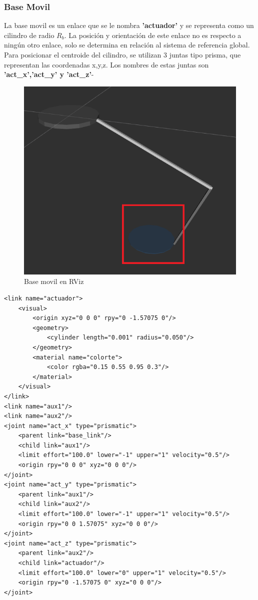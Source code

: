 \begin{lstlisting}
        \end{lstlisting}
       

       \subsubsection{Base Movil}

        La base movil es un enlace que se le nombra \textbf{'actuador'} y se representa como un cilindro de radio \textbf{$R_b$}. La posición y orientación de este enlace no es respecto a ningún otro enlace, solo se determina en relación al sistema de referencia global. Para posicionar el centroide del cilindro, se utilizan 3 juntas tipo prisma, que representan las coordenadas x,y,z. Los nombres de estas juntas son \textbf{'act\_x','act\_y' y 'act\_z'}-

        \begin{figure}[h]
                \centering
                \includegraphics[width=0.4\linewidth]{Main/Chapter6/Images6/cap6_basemovil.png}
                \caption{Base movil en RViz}
                \label{f:Cap6_urdf_4}
            \end{figure}

        \lstset{language=XML}
        \begin{lstlisting}
<link name="actuador">
	<visual>
		<origin xyz="0 0 0" rpy="0 -1.57075 0"/>
		<geometry>
			<cylinder length="0.001" radius="0.050"/>
		</geometry>
		<material name="colorte">
			<color rgba="0.15 0.55 0.95 0.3"/>
		</material>
	</visual>
</link>
<link name="aux1"/>
<link name="aux2"/>
<joint name="act_x" type="prismatic">
	<parent link="base_link"/>
	<child link="aux1"/>
	<limit effort="100.0" lower="-1" upper="1" velocity="0.5"/>
	<origin rpy="0 0 0" xyz="0 0 0"/>
</joint>
<joint name="act_y" type="prismatic">
	<parent link="aux1"/>
	<child link="aux2"/>
	<limit effort="100.0" lower="-1" upper="1" velocity="0.5"/>
	<origin rpy="0 0 1.57075" xyz="0 0 0"/>
</joint>
<joint name="act_z" type="prismatic">
	<parent link="aux2"/>
	<child link="actuador"/>
	<limit effort="100.0" lower="0" upper="1" velocity="0.5"/>
	<origin rpy="0 -1.57075 0" xyz="0 0 0"/>
</joint>
        \end{lstlisting}

